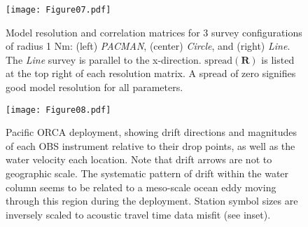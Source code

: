 \begin{figure}[h]
\texttt{[image: Figure07.pdf]}
\caption{ Model resolution and correlation matrices for 3 survey configurations of radius 1 Nm: (left) \textit{PACMAN}, (center) \textit{Circle}, and (right) \textit{Line}. The \textit{Line} survey is parallel to the x-direction. $\text{spread}(\mathbf{R})$ is listed at the top right of each resolution matrix. A spread of zero signifies good model resolution for all parameters. }
\label{fig:resolution_correlation}
\end{figure}

\begin{figure}[h]
\texttt{[image: Figure08.pdf]}
\caption{Pacific ORCA deployment, showing drift directions and magnitudes of each OBS instrument relative to their drop points, as well as the water velocity each location. Note that drift arrows are not to geographic scale. The systematic pattern of drift within the water column seems to be related to a meso-scale ocean eddy moving through this region during the deployment. Station symbol sizes are inversely scaled to acoustic travel time data misfit (see inset).}
\label{fig:meso_eddy}
\end{figure}